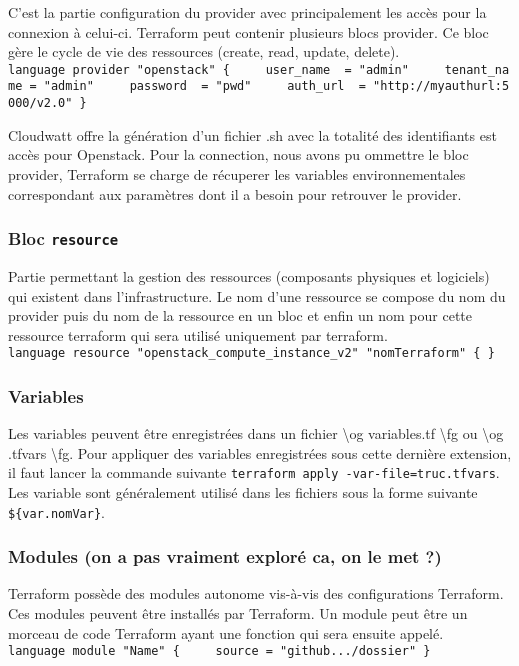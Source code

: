 \documentclass[]{article}
\begin{document}
C'est la partie configuration du provider avec principalement les accès
pour la connexion à celui-ci. Terraform peut contenir plusieurs blocs
provider. Ce bloc gère le cycle de vie des ressources (create, read,
update, delete).
\texttt{language\ provider\ "openstack"\ \{\ \ \ \ \ user\_name\ \ =\ "admin"\ \ \ \ \ tenant\_name\ =\ "admin"\ \ \ \ \ password\ \ =\ "pwd"\ \ \ \ \ auth\_url\ \ =\ "http://myauthurl:5000/v2.0"\ \}}

Cloudwatt offre la génération d'un fichier .sh avec la totalité des
identifiants est accès pour Openstack. Pour la connection, nous avons pu
ommettre le bloc provider, Terraform se charge de récuperer les
variables environnementales correspondant aux paramètres dont il a
besoin pour retrouver le provider.

\subsubsection{\texorpdfstring{Bloc
\textbf{\texttt{resource}}}{Bloc resource}}\label{bloc-resource}

Partie permettant la gestion des ressources (composants physiques et
logiciels) qui existent dans l'infrastructure. Le nom d'une ressource se
compose du nom du provider puis du nom de la ressource en un bloc et
enfin un nom pour cette ressource terraform qui sera utilisé uniquement
par terraform.
\texttt{language\ resource\ "openstack\_compute\_instance\_v2"\ "nomTerraform"\ \{\ \}}

\subsubsection{Variables}\label{variables}

Les variables peuvent être enregistrées dans un fichier
\textbackslash{}og variables.tf \textbackslash{}fg ou \textbackslash{}og
.tfvars \textbackslash{}fg. Pour appliquer des variables enregistrées
sous cette dernière extension, il faut lancer la commande suivante
\texttt{terraform\ apply\ -var-file=truc.tfvars}. Les variable sont
généralement utilisé dans les fichiers sous la forme suivante
\texttt{\$\{var.nomVar\}}.

\subsubsection{Modules (on a pas vraiment exploré ca, on le met
?)}\label{modules-on-a-pas-vraiment-exploruxe9-ca-on-le-met}

Terraform possède des modules autonome vis-à-vis des configurations
Terraform. Ces modules peuvent être installés par Terraform. Un module
peut être un morceau de code Terraform ayant une fonction qui sera
ensuite appelé.
\texttt{language\ module\ "Name"\ \{\ \ \ \ \ source\ =\ "github.../dossier"\ \}}
\end{document}
